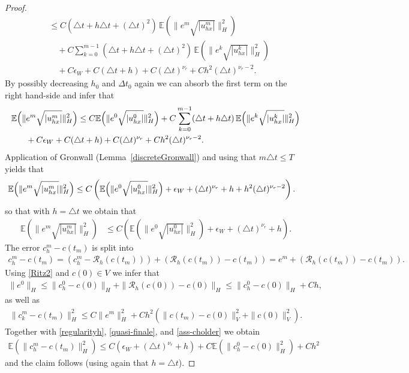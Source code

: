 \documentclass[a4paper,10pt]{article}
\numberwithin{equation}{section}
\begin{document}
\begin{proof}
\begin{align*}
& \leq C (\triangle t + h \triangle t + (\triangle t)^{2} )\,\mathbb{E} ( \| e^{m}\sqrt{|u^{m}_{hx}|} \|^{2}_{H}) \\
& \quad + C \sum_{k=0}^{m-1}(\triangle t + h \triangle t + (\triangle t)^{2} )\,\mathbb{E} ( \| e^{k}\sqrt{|u^{k}_{hx}|} \|^{2}_{H}) \\
& \quad + C \epsilon_{W} + C (\triangle t + h)
+ C (\triangle t)^{\nu_{r}} + Ch^{2} (\triangle t)^{\nu_{r} -2}.
\end{align*}
By possibly decreasing $h_{0}$ and $\Delta t_{0}$ again
we can absorb the first term on the right hand-side and infer that
\begin{align*}
\mathbb{E} \Big{(} \|& e^{m}\sqrt{|u^{m}_{hx}|} \|^{2}_{H} \Big{)} \leq C \mathbb{E} \Big{(} \| e^{0}\sqrt{|u^{0}_{hx}|}\|^{2}_{H} \Big{)} +
C \sum_{k=0}^{m-1}(\triangle t + h \triangle t )\,\mathbb{E} \Big{(} \| e^{k}\sqrt{|u^{k}_{hx}|} \|^{2}_{H} \Big{)} \\
&+ C \epsilon_{W} + C (\triangle t + h)
+ C (\triangle t)^{\nu_{r}} + Ch^{2} (\triangle t)^{\nu_{r} -2}.
\end{align*}
Application of Gronwall (Lemma~\ref{discreteGronwall}) and using that $m \triangle t \leq T$ yields that
\begin{align*}
\mathbb{E} \Big{(} \| e^{m}\sqrt{|u^{m}_{hx}|} \|^{2}_{H} \Big{)} & \leq C \left( \mathbb{E} \Big{(} \| e^{0} \sqrt{|u^{0}_{hx}|}\|^{2}_{H} \Big{)} +
 \epsilon_{W} + (\triangle t)^{\nu_{r}} + h + h^{2} (\triangle t)^{\nu_{r} -2}\right).
\end{align*}
so that with $h=\triangle t$ we obtain that
\begin{align}\label{quasi-finale}
 \mathbb{E} (\| e^{m}\sqrt{|u^{m}_{hx}|} \|^{2}_{H}) &\leq C \left( \mathbb{E}(\| e^{0}\sqrt{|u^{0}_{hx}|}\|^{2}_{H})
 + \epsilon_{W} + (\triangle t)^{\nu_{r}} + h \right) .
\end{align}
The error $c^{m}_{h}- c(t_{m})$ is split into
\begin{align*}
c^{m}_{h}- c(t_{m})= (c^{m}_{h}- \mathcal{R}_{h}(c(t_{m}))) + (\mathcal{R}_{h}(c(t_{m}))- c(t_{m})) =
e^{m} + (\mathcal{R}_{h}(c(t_{m}))- c(t_{m})).
\end{align*}
Using \eqref{Ritz2} and $c(0) \in V$ we infer that
\begin{align*}
\| e^{0}\|_{H} \leq \|c^{0}_{h}- c(0)\|_{H} + \|\mathcal{R}_{h}(c(0))- c(0)\|_{H} \leq \|c^{0}_{h}- c(0)\|_{H}+Ch,
\end{align*}
as well as 
\begin{align*}
\|c^{m}_{k}- c(t_{m})\|_{H}^{2} \leq C\| e^{m }\|_{H}^{2}+ Ch^{2} (\| c(t_{m}) -c(0)\|_{V}^{2}+ \| c(0)\|_{V}^{2}).
\end{align*}
Together with \eqref{regularityh}, \eqref{quasi-finale}, and \eqref{ass-cholder} we obtain
\begin{align*}
\mathbb{E}(\|c^{m}_{h}- c(t_{m})\|_{H}^{2}) \leq C(\epsilon_{W} + (\triangle t)^{\nu_{r}} + h )
+ C \mathbb{E}( \|c^{0}_{h}- c(0)\|^{2}_{H})+Ch^{2}
\end{align*}
and the claim follows (using again that $h=\triangle t$). 
\end{proof}
\end{document}
